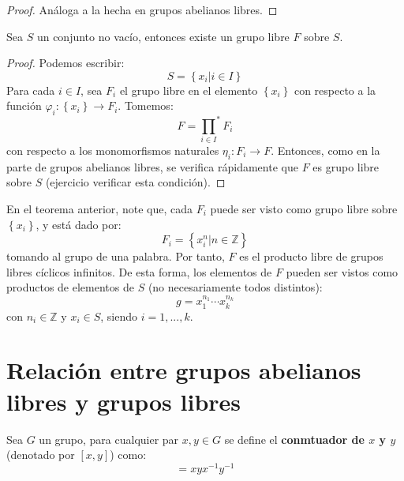 \documentclass[12pt]{report}
\theoremstyle{largebreak}
\newcommand\cf[3]{\ensuremath{#1:#2\rightarrow#3}}
\begin{document}
    \begin{proof}
        Análoga a la hecha en grupos abelianos libres.
    \end{proof}

    \begin{theor}
        Sea $S$ un conjunto no vacío, entonces existe un grupo libre $F$ sobre $S$.
    \end{theor}

    \begin{proof}
        Podemos escribir:
        \begin{equation*}
            S=\left\{x_i\Big|i\in I \right\}
        \end{equation*}
        Para cada $i\in I$, sea $F_i$ el grupo libre en el elemento $\left\{x_i \right\}$ con respecto a la función $\cf{\varphi_i}{\left\{x_i\right\}}{F_i}$. Tomemos:
        \begin{equation*}
            F={\prod_{ i\in I}}^*F_i
        \end{equation*}
        con respecto a los monomorfismos naturales $\cf{\eta_i}{F_i}{F}$. Entonces, como en la parte de grupos abelianos libres, se verifica rápidamente que $F$ es grupo libre sobre $S$ (ejercicio verificar esta condición).
    \end{proof}

    \begin{obs}
        En el teorema anterior, note que, cada $F_i$ puede ser visto como grupo libre sobre $\left\{x_i \right\}$, y está dado por:
        \begin{equation*}
            F_i=\left\{x_i^n\Big|n\in\mathbb{Z} \right\}
        \end{equation*}
        tomando al grupo de una palabra. Por tanto, $F$ es el producto libre de grupos libres cíclicos infinitos. De esta forma, los elementos de $F$ pueden ser vistos como productos de elementos de $S$ (no necesariamente todos distintos):
        \begin{equation*}
            g=x_1^{ n_1}\cdots x_k^{ n_k}
        \end{equation*}
        con $n_i\in\mathbb{Z}$ y $x_i\in S$, siendo $i=1,...,k$.
    \end{obs}

    \section{Relación entre grupos abelianos libres y grupos libres}

    \begin{mydef}
        Sea $G$ un grupo, para cualquier par $x,y\in G$ se define el \textbf{conmtuador de $x$ y $y$} (denotado por $[x,y]$) como:
        \begin{equation*}
            [x.y]=xyx^{-1}y^{-1}
        \end{equation*}
    \end{mydef}
\end{document}
